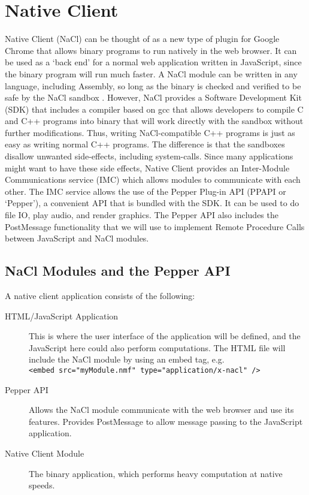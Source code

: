 \section{Native Client}
Native Client (NaCl) can be thought of as a new type of plugin for Google Chrome that allows binary programs to run natively in the web browser. It can be used as a `back end' for a normal web application written in JavaScript, since the binary program will run much faster. A NaCl module can be written in any language, including Assembly, so long as the binary is checked and verified to be safe by the NaCl sandbox \cite{nacl}. However, NaCl provides a Software Development Kit (SDK) that includes a compiler based on gcc that allows developers to compile C and C++ programs into binary that will work directly with the sandbox without further modifications. Thus, writing NaCl-compatible C++ programs is just as easy as writing normal C++ programs. The difference is that the sandboxes disallow unwanted side-effects, including system-calls. Since many applications might want to have these side effects, Native Client provides an Inter-Module Communications service (IMC) which allows modules to communicate with each other. The IMC service allows the use of the Pepper Plug-in API (PPAPI or `Pepper'), a convenient API that is bundled with the SDK. It can be used to do file IO, play audio, and render graphics. The Pepper API also includes the PostMessage functionality that we will use to implement Remote Procedure Calls between JavaScript and NaCl modules.

\subsection{NaCl Modules and the Pepper API}
A native client application consists of the following\cite{nacloverview}:
\begin{description}
  \item[HTML/JavaScript Application] 
  This is where the user interface of the application will be defined, and the   JavaScript here could also perform computations. The HTML file will include   the NaCl module by using an embed tag, e.g. \\
   \verb+<embed src="myModule.nmf" type="application/x-nacl" />+
  \item[Pepper API] 
  Allows the NaCl module communicate with the web browser and use its features.   Provides PostMessage to allow message passing to the JavaScript application.
  \item[Native Client Module] 
  The binary application, which performs heavy computation at native speeds.
\end{description}

